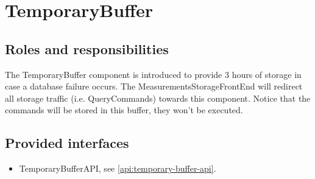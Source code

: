 \section{TemporaryBuffer}
\label{element:measurements-policy}

\subsection{Roles and responsibilities}

\npar The TemporaryBuffer component is introduced to provide 3 hours of storage
in case a database failure occurs. The MeasurementsStorageFrontEnd will redirect
all storage traffic (i.e. QueryCommands) towards this component. Notice that the
commands will be stored in this buffer, they won't be executed.

\subsection{Provided interfaces}

\begin{itemize}
  \item TemporaryBufferAPI, see \ref{api:temporary-buffer-api}.
\end{itemize}